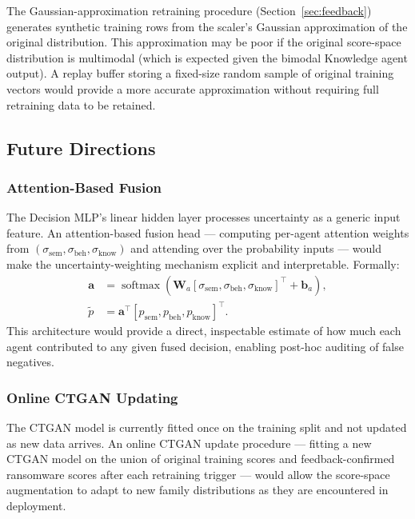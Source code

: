\documentclass[journal]{IEEEtran}
\newcommand{\sem}{\mathrm{sem}}
\newcommand{\beh}{\mathrm{beh}}
\newcommand{\know}{\mathrm{know}}
\newcommand{\pfused}{\tilde{p}}
\DeclareMathOperator{\softmax}{softmax}
\begin{document}
The Gaussian-approximation retraining procedure (Section~\ref{sec:feedback})
generates synthetic training rows from the scaler's Gaussian
approximation of the original distribution.
This approximation may be poor if the original score-space distribution
is multimodal (which is expected given the bimodal Knowledge agent
output).
A replay buffer storing a fixed-size random sample of original training
vectors would provide a more accurate approximation without requiring
full retraining data to be retained.

\subsection{Future Directions}

\subsubsection{Attention-Based Fusion}

The Decision MLP's linear hidden layer processes uncertainty as a
generic input feature.
An attention-based fusion head --- computing per-agent attention weights
from $(\sigma_{\sem}, \sigma_{\beh}, \sigma_{\know})$ and attending over
the probability inputs --- would make the uncertainty-weighting mechanism
explicit and interpretable.
Formally:
\begin{equation}
\begin{aligned}
  \mathbf{a} &= \softmax\!\left(
    \mathbf{W}_a [\sigma_{\sem}, \sigma_{\beh}, \sigma_{\know}]^\top
    + \mathbf{b}_a
  \right), \\
  \pfused &= \mathbf{a}^\top [p_{\sem}, p_{\beh}, p_{\know}]^\top.
\end{aligned}
\end{equation}
This architecture would provide a direct, inspectable estimate of how
much each agent contributed to any given fused decision, enabling
post-hoc auditing of false negatives.

\subsubsection{Online CTGAN Updating}

The CTGAN model is currently fitted once on the training split and not
updated as new data arrives.
An online CTGAN update procedure --- fitting a new CTGAN model on the
union of original training scores and feedback-confirmed ransomware
scores after each retraining trigger --- would allow the score-space
augmentation to adapt to new family distributions as they are
encountered in deployment.
\end{document}

